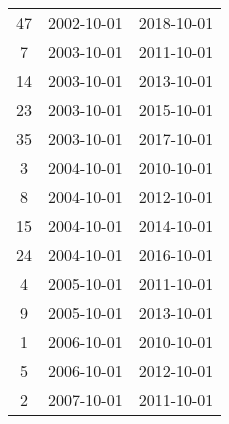 \begin{tabular}{ccc}
  47 & 2002-10-01 & 2018-10-01 \\ 
  7 & 2003-10-01 & 2011-10-01 \\ 
  14 & 2003-10-01 & 2013-10-01 \\ 
  23 & 2003-10-01 & 2015-10-01 \\ 
  35 & 2003-10-01 & 2017-10-01 \\ 
  3 & 2004-10-01 & 2010-10-01 \\ 
  8 & 2004-10-01 & 2012-10-01 \\ 
  15 & 2004-10-01 & 2014-10-01 \\ 
  24 & 2004-10-01 & 2016-10-01 \\ 
  4 & 2005-10-01 & 2011-10-01 \\ 
  9 & 2005-10-01 & 2013-10-01 \\ 
  1 & 2006-10-01 & 2010-10-01 \\ 
  5 & 2006-10-01 & 2012-10-01 \\ 
  2 & 2007-10-01 & 2011-10-01 \\ 
   \hline
\end{tabular}
